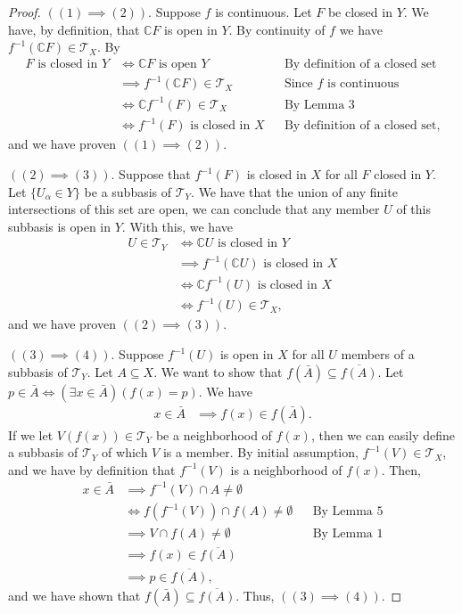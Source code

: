 \documentclass[10pt,a4paper]{article}
\theoremstyle{theorem}
\theoremstyle{definition}
\newcommand{\Tau}{\mathcal{T}}
\begin{document}
\begin{proof}
$((1) \implies (2))$.  Suppose $f$ is continuous.  Let $F$ be closed in $Y$. We have, by definition, that $\mathbb{C}F$ is open in $Y$. By continuity of $f$ we have $f^{-1}(\mathbb{C}F) \in \Tau_X$. By 
\begin{align*}
F \text{ is closed in } Y &\iff \mathbb{C}F \text{ is open } Y &&\text{By definition of a closed set}\\
&\implies f^{-1}(\mathbb{C}F) \in \Tau_X &&\text{Since } f \text{ is continuous}\\
&\iff \mathbb{C}f^{-1}(F) \in \Tau_X && \text{By Lemma 3}\\
&\iff f^{-1}(F) \text{ is closed in } X && \text{By definition of a closed set},
\end{align*}
and we have proven $((1) \implies (2))$. 

$((2) \implies (3))$.  Suppose that $f^{-1}(F)$ is closed in $X$ for all $F$ closed in $Y$. Let $\{U_\alpha \in Y\}$ be a subbasis of $\Tau_Y$.  We have that the union of any finite intersections of this set are open, we can conclude that any member $U$ of this subbasis is open in $Y$. With this, we have
\begin{align*}
U \in \Tau_Y &\iff \mathbb{C} U \text{ is closed in } Y\\
&\implies f^{-1}(\mathbb{C} U) \text{ is closed in } X\\
&\iff \mathbb{C} f^{-1}(U) \text{ is closed in } X\\
&\iff f^{-1}(U) \in \Tau_X \text{,}
\end{align*}
and we have proven $((2) \implies (3))$.

$((3) \implies (4))$.  Suppose $f^{-1}(U)$ is open in $X$ for all $U$ members of a subbasis of $\Tau_Y$. Let $A \subseteq X$.  We want to show that $f(\bar{A}) \subseteq \overline{f(A)}$.  Let $p \in \bar{A} \iff (\exists x \in \bar{A})(f(x) = p)$.  We have
\begin{align*}
x \in \bar{A} &\implies f(x) \in f(\bar{A}).
\end{align*}
If we let $V(f(x)) \in \Tau_Y$ be a neighborhood of $f(x)$, then we can easily define a subbasis of $\Tau_Y$ of which $V$ is a member. By initial assumption,  $f^{-1}(V) \in \Tau_X$, and we have by definition that $f^{-1}(V)$ is a neighborhood of $f(x)$. Then, 
\begin{align*}
x \in \bar{A} &\implies f^{-1}(V) \cap A \not = \emptyset\\
&\iff f(f^{-1}(V)) \cap f(A) \not = \emptyset &&\text{By Lemma 5}\\
&\implies V \cap f(A) \not = \emptyset &&\text{By Lemma 1}\\
&\implies f(x) \in \overline{f(A)}\\
&\implies p \in \overline{f(A)},
\end{align*}
and we have shown that $f(\bar{A}) \subseteq \overline{f(A)}$. Thus, $((3) \implies (4))$. 


\end{proof}
\end{document}
